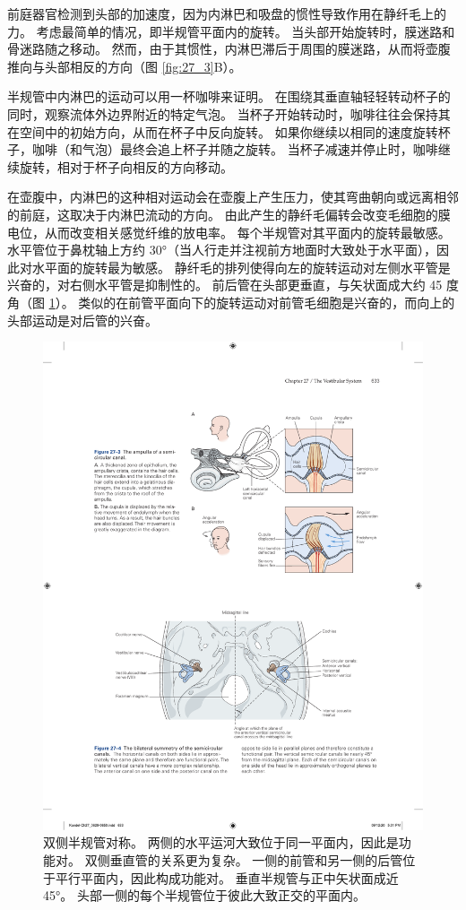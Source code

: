 前庭器官检测到头部的加速度，因为内淋巴和吸盘的惯性导致作用在静纤毛上的力。
考虑最简单的情况，即半规管平面内的旋转。
当头部开始旋转时，膜迷路和骨迷路随之移动。
然而，由于其惯性，内淋巴滞后于周围的膜迷路，从而将壶腹推向与头部相反的方向（图 \ref{fig:27_3}B）。


半规管中内淋巴的运动可以用一杯咖啡来证明。
在围绕其垂直轴轻轻转动杯子的同时，观察流体外边界附近的特定气泡。
当杯子开始转动时，咖啡往往会保持其在空间中的初始方向，从而在杯子中反向旋转。
如果你继续以相同的速度旋转杯子，咖啡（和气泡）最终会追上杯子并随之旋转。
当杯子减速并停止时，咖啡继续旋转，相对于杯子向相反的方向移动。


在壶腹中，内淋巴的这种相对运动会在壶腹上产生压力，使其弯曲朝向或远离相邻的前庭，这取决于内淋巴流动的方向。
由此产生的静纤毛偏转会改变毛细胞的膜电位，从而改变相关感觉纤维的放电率。
每个半规管对其平面内的旋转最敏感。 水平管位于鼻枕轴上方约 30°（当人行走并注视前方地面时大致处于水平面），因此对水平面的旋转最为敏感。
静纤毛的排列使得向左的旋转运动对左侧水平管是兴奋的，对右侧水平管是抑制性的。
前后管在头部更垂直，与矢状面成大约 45 度角（图 \ref{fig:27_4}）。 
类似的在前管平面向下的旋转运动对前管毛细胞是兴奋的，而向上的头部运动是对后管的兴奋。


\begin{figure}[htbp]
	\centering
	\includegraphics[width=0.75\linewidth]{chap27/fig_27_4}
	\caption{双侧半规管对称。 两侧的水平运河大致位于同一平面内，因此是功能对。 双侧垂直管的关系更为复杂。 一侧的前管和另一侧的后管位于平行平面内，因此构成功能对。 垂直半规管与正中矢状面成近 45°。 头部一侧的每个半规管位于彼此大致正交的平面内。}
	\label{fig:27_4}
\end{figure}


